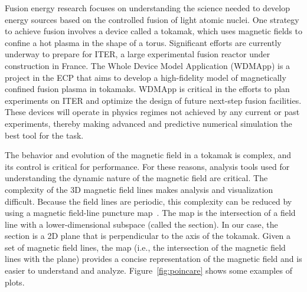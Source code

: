 Fusion energy research focuses on understanding the science needed to develop energy sources based on the controlled fusion of light atomic nuclei. One strategy to achieve fusion involves a device called a tokamak, which uses magnetic fields to confine a hot plasma in the shape of a torus.
Significant efforts are currently underway to prepare for ITER, a large experimental fusion reactor under construction in France.
The Whole Device Model Application (WDMApp) is a project in the ECP that aims to develop a high-fidelity model of magnetically confined fusion plasma in tokamaks. 
WDMApp is critical in the efforts to plan experiments on ITER and optimize the design of future next-step fusion facilities. These devices will operate in physics regimes not achieved by any current or past experiments, thereby making advanced and predictive numerical simulation the best tool for the task.




The behavior and evolution of the magnetic field in a tokamak is complex, and its control is critical for performance.
For these reasons, analysis tools used for understanding the dynamic nature of the magnetic field are critical.
The complexity of the 3D magnetic field lines makes analysis and visualization difficult.
Because the field lines are periodic, this complexity can be reduced by using a \poincare magnetic field-line puncture map~\citep{Sanderson2010}. 
The \poincare map is the intersection of a field line with a lower-dimensional subspace (called the \poincare section).
In our case, the \poincare section is a 2D plane that is perpendicular to the axis of the tokamak.
Given a set of magnetic field lines, the \poincare map (i.e., the intersection of the magnetic field lines with the plane) provides a concise 
representation of the magnetic field and is easier to understand and analyze.
Figure~\ref{fig:poincare} shows some examples of \poincare plots.

